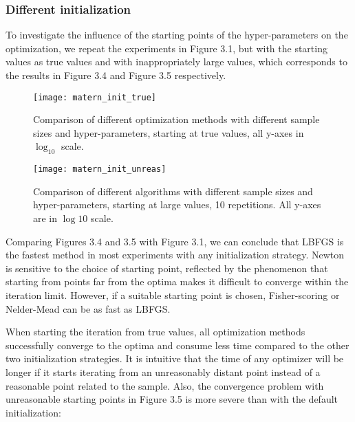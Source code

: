 \subsubsection{Different initialization}
To investigate the influence of the starting points of the hyper-parameters on the optimization, we repeat the experiments in Figure 3.1, but with the starting values as true values and with inappropriately large values, which corresponds to the results in Figure 3.4 and Figure 3.5 respectively.

\begin{figure}[hbt!]%
  \centering
  \texttt{[image: matern\_init\_true]} %
  \caption[Times of simulated GP-Matern starting at true values: line graphs with range bars]%
  {Comparison of different optimization methods with different sample sizes and hyper-parameters, starting at true values, all y-axes in $\log_{10}$ scale.}
  \label{fig:matern_init_true}
\end{figure}

\begin{figure}[hbt!]%
  \centering
  \texttt{[image: matern\_init\_unreas]} %
  \caption[Times of simulated GP-Matern starting at large values: line graphs with range bars]%
  {Comparison of different algorithms with different sample sizes and hyper-parameters, starting at large values, 10 repetitions. All y-axes are in $\log 10$ scale.}%
  \label{fig:matern_init_unreas}
\end{figure}

Comparing Figures 3.4 and 3.5 with Figure 3.1, we can conclude that LBFGS is the fastest method in most experiments with any initialization strategy. Newton is sensitive to the choice of starting point, reflected by the phenomenon that starting from points far from the optima makes it difficult to converge within the iteration limit. However, if a suitable starting point is chosen, Fisher-scoring or Nelder-Mead can be as fast as LBFGS.

When starting the iteration from true values, all optimization methods successfully converge to the optima and consume less time compared to the other two initialization strategies. It is intuitive that the time of any optimizer will be longer if it starts iterating from an unreasonably distant point instead of a reasonable point related to the sample. Also, the convergence problem with unreasonable starting points in Figure 3.5 is more severe than with the default initialization:

